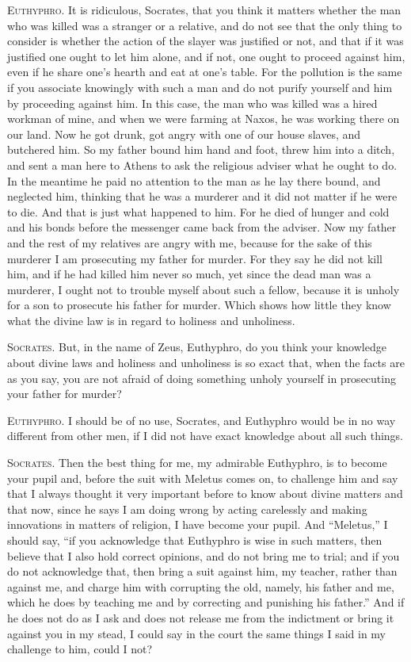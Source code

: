 \textsc{Euthyphro}. It is ridiculous, Socrates, that you think it
matters whether the man who was killed  was a stranger or a
relative, and do not see that the only thing to consider is whether
the action of the slayer was justified or not, and that if it was
justified one ought to let him alone, and if not, one ought to proceed
against him, even if he share one's hearth and eat at one's table. For
the pollution is the same if you associate knowingly with such a man
and do not purify yourself and him by proceeding against him. In this
case, the man who was killed was a hired workman of mine, and when we
were farming at Naxos, he was working there on our land. Now he got
drunk, got angry with one of our house slaves, and butchered him. So
my father bound him hand and foot, threw him into a ditch, and sent a
man here to Athens to ask the religious adviser what he ought to do.
In the meantime he paid no attention to the man as he lay there bound,
and neglected him, thinking that he was a murderer and it did not
matter if he were to die. And that is just what happened to him. For
he died of hunger and cold and his bonds before the messenger came
back from the adviser. Now my father and the rest of my relatives are
angry with me, because for the sake of this murderer I am prosecuting
my father for murder. For they say he did not kill him, and if he had
killed him never so much, yet since the dead man was a murderer, I
ought not to trouble myself about such a fellow, because it is unholy
for a son to prosecute his father for murder. Which shows how little
they know what the divine law is in regard to holiness and unholiness.

\textsc{Socrates}. But, in the name of Zeus, Euthyphro, do you think
your knowledge about divine laws and  holiness and unholiness
is so exact that, when the facts are as you say, you are not afraid of
doing something unholy yourself in prosecuting your father for murder?

\textsc{Euthyphro}. I should be of no use, Socrates, and Euthyphro
would be in no way different from other men, if I did not have exact
knowledge about all such things.

\textsc{Socrates}. Then the best thing for me, my admirable Euthyphro,
is to become your pupil and, before the suit with Meletus comes on, to
challenge him and say that I always thought it very important before
to know about divine matters and that now, since he says I am doing
wrong by acting carelessly and making innovations in matters of
religion, I have become your pupil. And ``Meletus,'' I should say,
``if you acknowledge that Euthyphro is wise in such matters, then
believe that I also hold correct opinions, and do not bring me to
trial; and if you do not acknowledge that, then bring a suit against
him, my teacher, rather than against me, and charge him with
corrupting the old, namely, his father and me, which he does by
teaching me and by correcting and punishing his father.'' And if he
does not do as I ask and does not release me from the indictment or
bring it against you in my stead, I could say in the court the same
things I said in my challenge to him, could I not?

